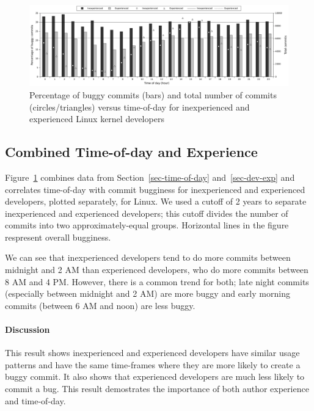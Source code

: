 \begin{figure}[tbh]
\includegraphics[width=\textwidth]{linux-bugginess-hour-experienced.pdf}
\caption{\label{fig-linux-bugginess-experienced}Percentage of buggy commits
  (bars) and total number of commits (circles/triangles) versus time-of-day for
  inexperienced and experienced Linux kernel developers}
\end{figure}

\subsection{Combined Time-of-day and Experience}
\label{sec:toddev-exp}

Figure~\ref{fig-linux-bugginess-experienced} combines data from
Section~\ref{sec-time-of-day} and~\ref{sec-dev-exp} and correlates time-of-day
with commit bugginess for inexperienced and experienced developers,
plotted separately, for Linux. We used
a cutoff of 2 years to separate inexperienced and experienced developers; 
this cutoff divides the number of commits into two approximately-equal groups. 
Horizontal lines in the figure respresent overall
bugginess. 

We can see that inexperienced developers tend to do more commits between
midnight and 2 AM than experienced developers, who do more commits between 8 AM
and 4 PM. However, there is a common trend for both; late night commits
(especially between midnight and 2 AM) are more buggy and early morning commits
(between 6 AM and noon) are less buggy.

\paragraph{Discussion}

This result shows inexperienced and experienced developers have similar usage
patterns and have the same time-frames where they are more likely to create a
buggy commit. It also shows that experienced developers are much less likely to
commit a bug.  This result demostrates the importance of both author experience
and time-of-day.

